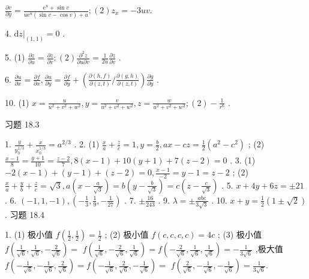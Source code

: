 \(\frac{\partial v}{\partial y} = \frac{{\mathrm{e}}^{u} + \sin v}{u{\mathrm{e}}^{u}\left( {\sin v - \cos v}\right)  + u};\left( 2\right) {z}_{x} =  - {3uv}.\)

4. \({\left. \mathrm{d}z\right| }_{\left( 1,1\right) } = 0\) .

5. (1) \(\frac{\partial z}{\partial u} = \frac{\partial z}{\partial v};\left( 2\right) \frac{{\partial }^{2}z}{\partial u\partial v} = \frac{1}{2u}\frac{\partial z}{\partial v}\) .

6. \(\frac{\partial u}{\partial x} = \frac{\partial f}{\partial x},\frac{\partial u}{\partial y} = \frac{\partial f}{\partial y} + \left( {\frac{\partial \left( {h,f}\right) }{\partial \left( {z,t}\right) }/\frac{\partial \left( {g,h}\right) }{\partial \left( {z,t}\right) }}\right) \frac{\partial g}{\partial y}\) .

10. (1) \(x = \frac{u}{{u}^{2} + {v}^{2} + {w}^{2}},y = \frac{v}{{u}^{2} + {v}^{2} + {w}^{2}},z = \frac{w}{{u}^{2} + {v}^{2} + {w}^{2}};\left( 2\right)  - \frac{1}{{r}^{6}}\) .

习题 18.3

1. \(\frac{y}{{y}_{0}^{1/3}} + \frac{x}{{x}_{0}^{1/3}} = {a}^{2/3}\) . 2. (1) \(\frac{x}{a} + \frac{z}{c} = 1,y = \frac{b}{2},{ax} - {cz} = \frac{1}{2}\left( {{a}^{2} - {c}^{2}}\right)\) ; (2) \(\frac{x - 1}{8} = \frac{y + 1}{10} = \frac{z - 2}{7},8\left( {x - 1}\right)  + {10}\left( {y + 1}\right)  + 7\left( {z - 2}\right)  = 0\) . 3. (1) \(- 2\left( {x - 1}\right)  + \left( {y - 1}\right)  + \left( {z - 2}\right)  = 0,\frac{x - 1}{-2} = y - 1 = z - 2\) ; (2) \(\frac{x}{a} + \frac{y}{b} + \frac{z}{c} = \sqrt{3},a\left( {x - \frac{a}{\sqrt{3}}}\right)  = b\left( {y - \frac{b}{\sqrt{3}}}\right)  = c\left( {z - \frac{c}{\sqrt{3}}}\right)\) . 5. \(x + {4y} + {6z} =  \pm  {21}\) . 6. \(\left( {-1,1, - 1}\right) ,\left( {-\frac{1}{3},\frac{1}{9}, - \frac{1}{27}}\right)\) . 7. \(\pm  \frac{16}{243}\) . 9. \(\lambda  =  \pm  \frac{abc}{3\sqrt{3}}\) . 10. \(x + y = \frac{1}{2}\left( {1 \pm  \sqrt{2}}\right)\) . 习题 18.4

1. (1) 极小值 \(f\left( {\frac{1}{2},\frac{1}{2}}\right)  = \frac{1}{2}\) ; (2) 极小值 \(f\left( {c,c,c,c}\right)  = {4c}\) ; (3) 极小值 \(f\left( {\frac{1}{\sqrt{6}},\frac{1}{\sqrt{6}}, - \frac{2}{\sqrt{6}}}\right)  =\)  \(f\left( {\frac{1}{\sqrt{6}}, - \frac{2}{\sqrt{6}},\frac{1}{\sqrt{6}}}\right)  = f\left( {-\frac{2}{\sqrt{6}},\frac{1}{\sqrt{6}},\frac{1}{\sqrt{6}}}\right)  =  - \frac{1}{3\sqrt{6}}\) ,极大值 \(f\left( {-\frac{1}{\sqrt{6}}, - \frac{1}{\sqrt{6}},\frac{2}{\sqrt{6}}}\right)  = f\left( {-\frac{1}{\sqrt{6}},\frac{2}{\sqrt{6}}, - \frac{1}{\sqrt{6}}}\right)  =\)  \(f\left( {\frac{2}{\sqrt{6}}, - \frac{1}{\sqrt{6}}, - \frac{1}{\sqrt{6}}}\right)  = \frac{1}{3\sqrt{6}}.\)


